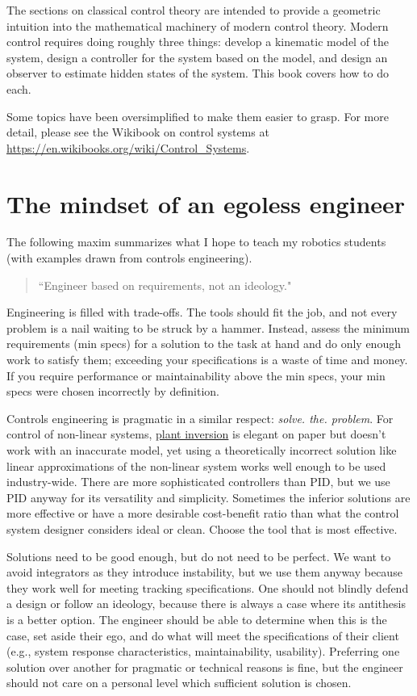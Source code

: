 The sections on classical control theory are intended to provide a geometric
intuition into the mathematical machinery of modern control theory. Modern
control requires doing roughly three things: develop a kinematic model of the
system, design a controller for the system based on the model, and design an
observer to estimate hidden states of the system. This book covers how to do
each.

Some topics have been oversimplified to make them easier to grasp. For more
detail, please see the Wikibook on control systems at
\url{https://en.wikibooks.org/wiki/Control_Systems}.

\section{The mindset of an egoless engineer}

The following maxim summarizes what I hope to teach my robotics students (with
examples drawn from controls engineering).

\begin{quote}
  ``Engineer based on requirements, not an ideology."
\end{quote}

Engineering is filled with trade-offs. The tools should fit the job, and not
every problem is a nail waiting to be struck by a hammer. Instead, assess the
minimum requirements (min specs) for a solution to the task at hand and do only
enough work to satisfy them; exceeding your specifications is a waste of time
and money. If you require performance or maintainability above the min specs,
your min specs were chosen incorrectly by definition.

Controls engineering is pragmatic in a similar respect:
\textit{solve. the. problem}. For control of non-linear systems,
\href{https://faculty.washington.edu/devasia/Inversion.html}{plant inversion}
is elegant on paper but doesn't work with an inaccurate model, yet using a
theoretically incorrect solution like linear approximations of the non-linear
system works well enough to be used industry-wide. There are more sophisticated
controllers than PID, but we use PID anyway for its versatility and simplicity.
Sometimes the inferior solutions are more effective or have a more desirable
cost-benefit ratio than what the control system designer considers ideal or
clean. Choose the tool that is most effective.

Solutions need to be good enough, but do not need to be perfect. We want to
avoid integrators as they introduce instability, but we use them anyway because
they work well for meeting tracking specifications. One should not blindly
defend a design or follow an ideology, because there is always a case where its
antithesis is a better option. The engineer should be able to determine when
this is the case, set aside their ego, and do what will meet the specifications
of their client (e.g., system response characteristics, maintainability,
usability). Preferring one solution over another for pragmatic or technical
reasons is fine, but the engineer should not care on a personal level which
sufficient solution is chosen.

